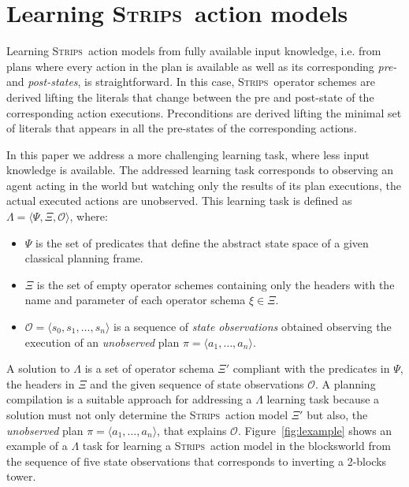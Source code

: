\documentclass{article}
\newcommand{\tup}[1]{{\langle #1 \rangle}}
\newcommand{\strips}{\textsc{Strips}}     %
\begin{document}
\section{Learning \strips\ action models}
Learning \strips\ action models from fully available input knowledge, i.e. from plans where every action in the plan is available as well as its corresponding {\em pre-} and {\em post-states}, is straightforward. In this case, \strips\ operator schemes are derived lifting the literals that change between the pre and post-state of the corresponding action executions. Preconditions are derived lifting the minimal set of literals that appears in all the pre-states of the corresponding actions.

In this paper we address a more challenging learning task, where less input knowledge is available. The addressed learning task corresponds to observing an agent acting in the world but watching only the results of its plan executions, the actual executed actions are unobserved. This learning task is defined as $\Lambda=\tup{\Psi,\Xi,\mathcal{O}}$, where:
\begin{itemize}
\item $\Psi$ is the set of predicates that define the abstract state space of a given classical planning frame.
\item $\Xi$ is the set of empty operator schemes containing only the headers with the name and parameter of each operator schema $\xi\in\Xi$.
\item $\mathcal{O}=\tup{s_0,s_1,\ldots,s_{n}}$ is a sequence of {\em state observations} obtained observing the execution of an {\em unobserved} plan $\pi=\tup{a_1, \ldots, a_n}$.
\end{itemize}

A solution to $\Lambda$ is a set of operator schema $\Xi'$ compliant with the predicates in $\Psi$, the headers in $\Xi$ and the given sequence of state observations $\mathcal{O}$. A planning compilation is a suitable approach for addressing a $\Lambda$ learning task because a solution must not only determine the \strips\ action model $\Xi'$ but also, the {\em unobserved} plan $\pi=\tup{a_1, \ldots, a_n}$, that explains $\mathcal{O}$. Figure~\ref{fig:lexample} shows an example of a $\Lambda$ task for learning a \strips\ action model in the blocksworld from the sequence of five state observations that corresponds to inverting a 2-blocks tower.
\end{document}

